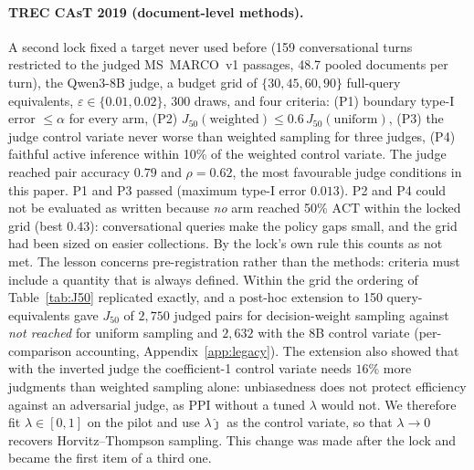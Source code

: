 \documentclass{article}
\newcommand{\eps}{\varepsilon}
\newcommand{\ACT}{\mathrm{ACT}}
\newcommand{\Jfifty}{J_{50}}
\begin{document}
\paragraph{TREC CAsT 2019 (document-level methods).} A second lock fixed a target never used before (159 conversational turns restricted to the judged MS~MARCO~v1 passages, 48.7 pooled documents per turn), the Qwen3-8B judge, a budget grid of $\{30,45,60,90\}$ full-query equivalents, $\eps\in\{0.01,0.02\}$, 300 draws, and four criteria: (P1) boundary type-I error $\le\alpha$ for every arm, (P2) $\Jfifty(\text{weighted})\le0.6\,\Jfifty(\text{uniform})$, (P3) the judge control variate never worse than weighted sampling for three judges, (P4) faithful active inference within 10\% of the weighted control variate. The judge reached pair accuracy $0.79$ and $\rho=0.62$, the most favourable judge conditions in this paper. P1 and P3 passed (maximum type-I error $0.013$). P2 and P4 could not be evaluated as written because \emph{no} arm reached 50\% $\ACT$ within the locked grid (best $0.43$): conversational queries make the policy gaps small, and the grid had been sized on easier collections. By the lock's own rule this counts as not met. The lesson concerns pre-registration rather than the methods: criteria must include a quantity that is always defined. Within the grid the ordering of Table~\ref{tab:J50} replicated exactly, and a post-hoc extension to 150 query-equivalents gave $\Jfifty$ of $2{,}750$ judged pairs for decision-weight sampling against \emph{not reached} for uniform sampling and $2{,}632$ with the 8B control variate (per-comparison accounting, Appendix~\ref{app:legacy}). The extension also showed that with the inverted judge the coefficient-1 control variate needs $16\%$ more judgments than weighted sampling alone: unbiasedness does not protect efficiency against an adversarial judge, as PPI without a tuned $\lambda$ would not. We therefore fit $\lambda\in[0,1]$ on the pilot and use $\lambda\hat\jmath$ as the control variate, so that $\lambda\to0$ recovers Horvitz--Thompson sampling. This change was made after the lock and became the first item of a third one.
\end{document}
